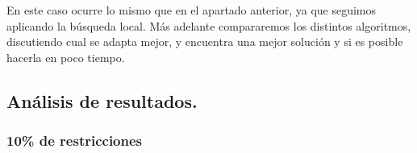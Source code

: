 \documentclass[12pt, spanish]{article}
\begin{document}
En este caso ocurre lo mismo que en el apartado anterior, ya que seguimos aplicando la búsqueda local. Más adelante compararemos los distintos algoritmos, discutiendo cual se adapta mejor, y encuentra una mejor solución y si es posible hacerla en poco tiempo.


\newpage

\subsection{Análisis de resultados.	}

\subsubsection{10\% de restricciones}

\end{document}
